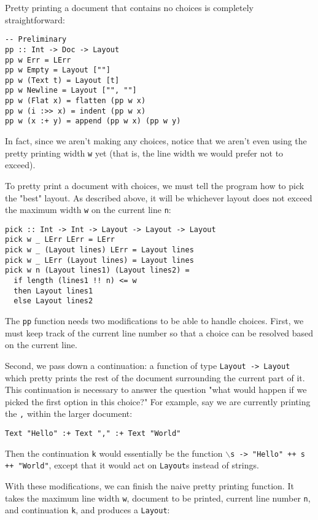 \documentclass{article}
\begin{document}
Pretty printing a document that contains no choices is completely straightforward:

\begin{lstlisting}
-- Preliminary
pp :: Int -> Doc -> Layout
pp w Err = LErr
pp w Empty = Layout [""]
pp w (Text t) = Layout [t]
pp w Newline = Layout ["", ""]
pp w (Flat x) = flatten (pp w x)
pp w (i :>> x) = indent (pp w x)
pp w (x :+ y) = append (pp w x) (pp w y)
\end{lstlisting}

In fact, since we aren't making any choices, notice that we aren't even using the pretty printing
width \texttt{w} yet (that is, the line width we would prefer not to exceed).

To pretty print a document with choices, we must tell the program how to pick the "best" layout. As
described above, it will be whichever layout does not exceed the maximum width \texttt{w} on the
current line \texttt{n}:
\begin{lstlisting}
pick :: Int -> Int -> Layout -> Layout -> Layout
pick w _ LErr LErr = LErr
pick w _ (Layout lines) LErr = Layout lines
pick w _ LErr (Layout lines) = Layout lines
pick w n (Layout lines1) (Layout lines2) =
  if length (lines1 !! n) <= w
  then Layout lines1
  else Layout lines2
\end{lstlisting}

The \texttt{pp} function needs two modifications to be able to handle choices. First, we must keep
track of the current line number so that a choice can be resolved based on the current line.

Second, we pass down a continuation: a function of type \texttt{Layout -> Layout} which pretty
prints the rest of the document surrounding the current part of it. This continuation is necessary
to answer the question "what would happen if we picked the first option in this choice?" For
example, say we are currently printing the \texttt{,} within the larger document:

\begin{lstlisting}
Text "Hello" :+ Text "," :+ Text "World"
\end{lstlisting}

Then the continuation \texttt{k} would essentially be the function \texttt{$\backslash$s -> "Hello"
++ s ++ "World"}, except that it would act on \texttt{Layout}s instead of strings.

With these modifications, we can finish the naive pretty printing function. It takes the maximum
line width \texttt{w}, document to be printed, current line number \texttt{n}, and continuation
\texttt{k}, and produces a \texttt{Layout}:
\end{document}
